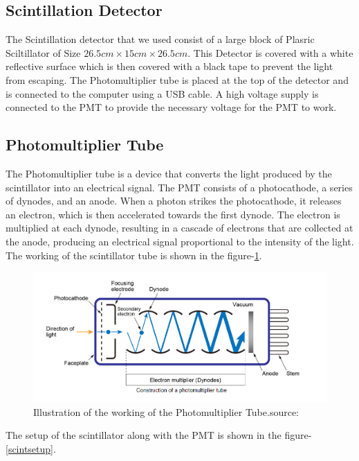 \documentclass{article}
\begin{document}
\begin{multicols}{2}
\subsection{Scintillation Detector}

The Scintillation detector that we used consist of a large block of Plasric Sciltillator of Size $26.5cm \times 15cm \times 26.5cm$. This Detector is covered with a white reflective surface which is then covered with a black tape to prevent the light from escaping. The Photomultiplier tube is placed at the top of the detector and is connected to the computer using a USB cable. A high voltage supply is connected to the PMT to provide the necessary voltage for the PMT to work.

\subsection{Photomultiplier Tube}

The Photomultiplier tube is a device that converts the light produced by the scintillator into an electrical signal. The PMT consists of a photocathode, a series of dynodes, and an anode. When a photon strikes the photocathode, it releases an electron, which is then accelerated towards the first dynode. The electron is multiplied at each dynode, resulting in a cascade of electrons that are collected at the anode, producing an electrical signal proportional to the intensity of the light.
The working of the scintillator tube is shown in the figure-\ref{pmt}.
\begin{figure}[H]
    \centering
    \includegraphics[width = \columnwidth]{Images/pmtsetup.png}
    \caption{Illustration of the working of the Photomultiplier Tube.source:}
    \label{pmt}
\end{figure}

The setup of the scintillator along with the PMT is shown in the figure-\ref{scintsetup}.


\end{multicols}
\end{document}
